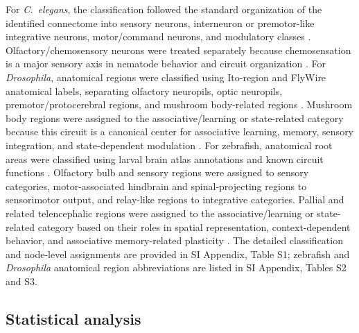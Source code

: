 \documentclass[9pt,twocolumn,twoside]{pnas-new}
\begin{document}
{For \textit{C.~elegans}, the classification followed the standard organization of the identified connectome into sensory neurons, interneuron or premotor-like integrative neurons, motor/command neurons, and modulatory classes \citep{Cook2019,AtanasKim2023}. Olfactory/chemosensory neurons were treated separately because chemosensation is a major sensory axis in nematode behavior and circuit organization \citep{Bargmann2006Chemosensation,Leinwand2016OlfactoryNematodes}. For \textit{Drosophila}, anatomical regions were classified using Ito-region and FlyWire anatomical labels, separating olfactory neuropils, optic neuropils, premotor/protocerebral regions, and mushroom body-related regions \citep{Ito2014InsectBrainNomenclature,Dorkenwald2024FlyWire,Turner2021Branson999}. Mushroom body regions were assigned to the associative/learning or state-related category because this circuit is a canonical center for associative learning, memory, sensory integration, and state-dependent modulation \citep{Aso2014MushroomBodyArchitecture,Li2020MushroomBodyConnectome}. For zebrafish, anatomical root areas were classified using larval brain atlas annotations and known circuit functions \citep{Wullimann1996Neuroanatomy,Randlett2015ZBrain}. Olfactory bulb and sensory regions were assigned to sensory categories, motor-associated hindbrain and spinal-projecting regions to sensorimotor output, and relay-like regions to integrative categories. Pallial and related telencephalic regions were assigned to the associative/learning or state-related category based on their roles in spatial representation, context-dependent behavior, and associative memory-related plasticity \citep{Yanez2022ZebrafishPalliumHodology,Yang2024SpatialCode,Dempsey2022ZebrafishMemorySynapses}. The detailed classification and node-level assignments are provided in SI Appendix, Table S1; zebrafish and \textit{Drosophila} anatomical region abbreviations are listed in SI Appendix, Tables S2 and S3.


\subsection*{Statistical analysis}

}
\end{document}
